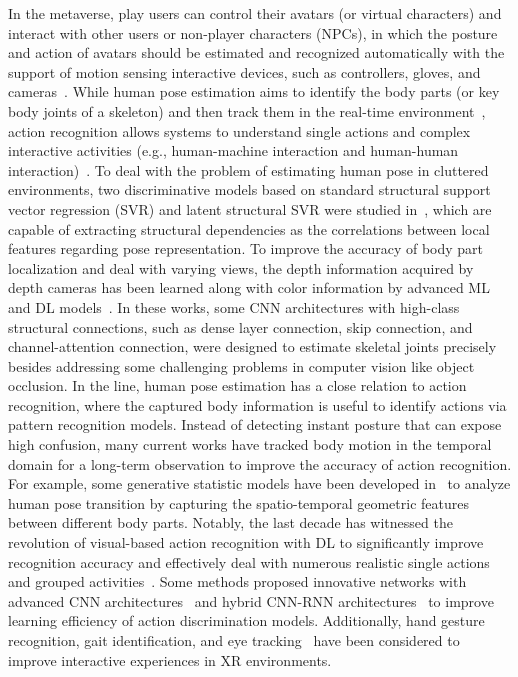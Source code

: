 \documentclass[journal]{IEEEtran}
\begin{document}
In the metaverse, play users can control their avatars (or virtual characters) and interact with other users or non-player characters (NPCs), in which the posture and action of avatars should be estimated and recognized automatically with the support of motion sensing interactive devices, such as controllers, gloves, and cameras~\cite{dang2019deep}.
While human pose estimation aims to identify the body parts (or key body joints of a skeleton) and then track them in the real-time environment~\cite{zheng2020deep}, action recognition allows systems to understand single actions and complex interactive activities (e.g., human-machine interaction and human-human interaction)~\cite{ramanathan2014human}. 
To deal with the problem of estimating human pose in cluttered environments, two discriminative models based on standard structural support vector regression (SVR) and latent structural SVR were studied in~\cite{chen2011human}, which are capable of extracting structural dependencies as the correlations between local features regarding pose representation.  
To improve the accuracy of body part localization and deal with varying views, the depth information acquired by depth cameras has been learned along with color information by advanced ML and DL models~\cite{rogez2019lcr, he2019interacting, zhao2020learning}.
In these works, some CNN architectures with high-class structural connections, such as dense layer connection, skip connection, and channel-attention connection, were designed to estimate skeletal joints precisely besides addressing some challenging problems in computer vision like object occlusion.
In the line, human pose estimation has a close relation to action recognition, where the captured body information is useful to identify actions via pattern recognition models.
Instead of detecting instant posture that can expose high confusion, many current works have tracked body motion in the temporal domain for a long-term observation to improve the accuracy of action recognition.
For example, some generative statistic models have been developed in~\cite{huynh2016interactive, tu2018ml, huynh2018hierarchical} to analyze human pose transition by capturing the spatio-temporal geometric features between different body parts.
Notably, the last decade has witnessed the revolution of visual-based action recognition with DL to significantly improve recognition accuracy and effectively deal with numerous realistic single actions and grouped activities~\cite{wang2017beyond}. 
Some methods proposed innovative networks with advanced CNN architectures~\cite{huynh2020encoding} and hybrid CNN-RNN architectures~\cite{wang2017beyond} to improve learning efficiency of action discrimination models.
Additionally, hand gesture recognition, gait identification, and eye tracking~\cite{huynh2020learning, hu2020dgaze} have been considered to improve interactive experiences in XR environments. 
\end{document}

